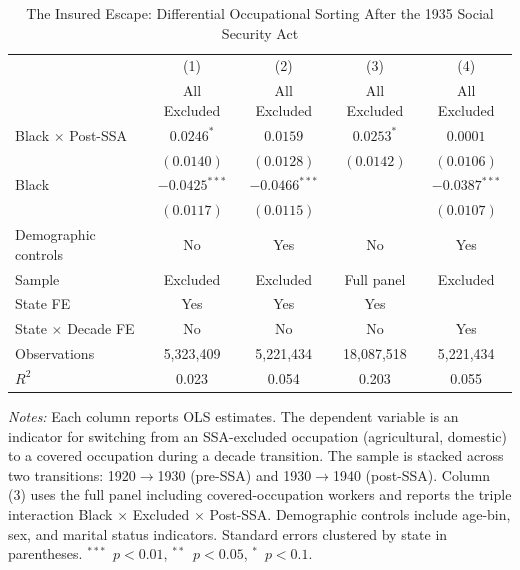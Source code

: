\begin{table}[t]
\centering
\caption{The Insured Escape: Differential Occupational Sorting After the 1935 Social Security Act}
\label{tab:main}
\begin{tabular}{lcccc}
\hline\hline
 & (1) & (2) & (3) & (4) \\
 & All Excluded & All Excluded & All Excluded & All Excluded \\
\hline
Black $\times$ Post-SSA & $0.0246^{*}$ & $0.0159$ & $0.0253^{*}$ & $0.0001$ \\
 & $(0.0140)$ & $(0.0128)$ & $(0.0142)$ & $(0.0106)$ \\
\addlinespace
Black & $-0.0425^{***}$ & $-0.0466^{***}$ & & $-0.0387^{***}$ \\
 & $(0.0117)$ & $(0.0115)$ & & $(0.0107)$ \\
\addlinespace
\hline
Demographic controls & No & Yes & No & Yes \\
Sample & Excluded & Excluded & Full panel & Excluded \\
State FE & Yes & Yes & Yes & \\
State $\times$ Decade FE & No & No & No & Yes \\
Observations & 5,323,409 & 5,221,434 & 18,087,518 & 5,221,434 \\
$R^2$ & 0.023 & 0.054 & 0.203 & 0.055 \\
\hline\hline
\end{tabular}
\begin{tablenotes}
\small
\item \textit{Notes:} Each column reports OLS estimates. The dependent variable is an indicator for switching from an SSA-excluded occupation (agricultural, domestic) to a covered occupation during a decade transition. The sample is stacked across two transitions: 1920$\to$1930 (pre-SSA) and 1930$\to$1940 (post-SSA). Column (3) uses the full panel including covered-occupation workers and reports the triple interaction Black $\times$ Excluded $\times$ Post-SSA. Demographic controls include age-bin, sex, and marital status indicators. Standard errors clustered by state in parentheses. $^{***}$~$p<0.01$, $^{**}$~$p<0.05$, $^{*}$~$p<0.1$.
\end{tablenotes}
\end{table}
